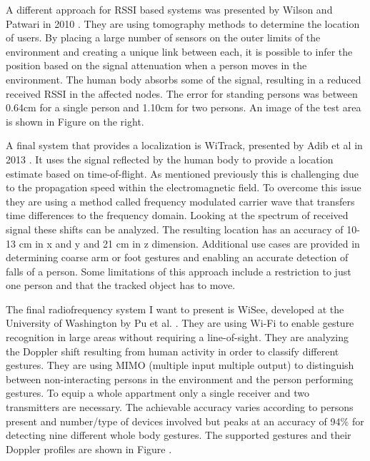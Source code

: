 A different approach for RSSI based systems was presented by Wilson and Patwari in 2010 \cite{wilson2010radio}. They are using tomography methods to determine the location of users. By placing a large number of sensors on the outer limits of the environment and creating a unique link between each, it is possible to infer the position based on the signal attenuation when a person moves in the environment. The human body absorbs some of the signal, resulting in a reduced received RSSI in the affected nodes. The error for standing persons was between 0.64cm for a single person and 1.10cm for two persons. An image of the test area is shown in Figure on the right.

A final system that provides a localization is WiTrack, presented by Adib et al in 2013 \cite{adib20133d}. It uses the signal reflected by the human body to provide a location estimate based on time-of-flight. As mentioned previously this is challenging due to the propagation speed within the electromagnetic field. To overcome this issue they are using a method called frequency modulated carrier wave that transfers time differences to the frequency domain. Looking at the spectrum of received signal these shifts can be analyzed. The resulting location has an accuracy of 10-13 cm in x and y and 21 cm in z dimension. Additional use cases are provided in determining coarse arm or foot gestures and enabling an accurate detection of falls of a person. Some limitations of this approach include a restriction to just one person and that the tracked object has to move.

The final radiofrequency system I want to present is WiSee, developed at the University of Washington by Pu et al. \cite{pu2013whole}. They are using Wi-Fi to enable gesture recognition in large areas without requiring a line-of-sight. They are analyzing the Doppler shift resulting from human activity in order to classify different gestures. They are using MIMO (multiple input multiple output) to distinguish between non-interacting persons in the environment and the person performing gestures. To equip a whole appartment only a single receiver and two transmitters are necessary. The achievable accuracy varies according to persons present and number/type of devices involved but peaks at an accuracy of 94\% for detecting nine different whole body gestures. The supported gestures and their Doppler profiles are shown in Figure .